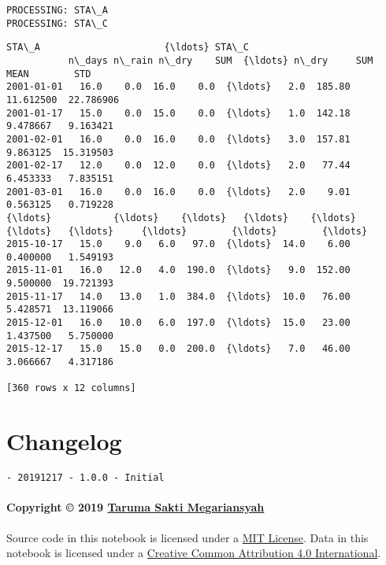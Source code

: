 \documentclass[11pt]{article}
\makeatletter
\newcommand{\boxspacing}{\kern\kvtcb@left@rule\kern\kvtcb@boxsep}
\newcommand{\prompt}[4]{
        \ttfamily\llap{{\color{#2}[#3]:\hspace{3pt}#4}}\vspace{-\baselineskip}
    }
\makeatother
\begin{document}
    \begin{Verbatim}[commandchars=\\\{\}]
PROCESSING: STA\_A
PROCESSING: STA\_C
    \end{Verbatim}

            \begin{tcolorbox}[breakable, size=fbox, boxrule=.5pt, pad at break*=1mm, opacityfill=0]
\prompt{Out}{outcolor}{12}{\boxspacing}
\begin{Verbatim}[commandchars=\\\{\}]
            STA\_A                      {\ldots} STA\_C
           n\_days n\_rain n\_dry    SUM  {\ldots} n\_dry     SUM       MEAN        STD
2001-01-01   16.0    0.0  16.0    0.0  {\ldots}   2.0  185.80  11.612500  22.786906
2001-01-17   15.0    0.0  15.0    0.0  {\ldots}   1.0  142.18   9.478667   9.163421
2001-02-01   16.0    0.0  16.0    0.0  {\ldots}   3.0  157.81   9.863125  15.319503
2001-02-17   12.0    0.0  12.0    0.0  {\ldots}   2.0   77.44   6.453333   7.835151
2001-03-01   16.0    0.0  16.0    0.0  {\ldots}   2.0    9.01   0.563125   0.719228
{\ldots}           {\ldots}    {\ldots}   {\ldots}    {\ldots}  {\ldots}   {\ldots}     {\ldots}        {\ldots}        {\ldots}
2015-10-17   15.0    9.0   6.0   97.0  {\ldots}  14.0    6.00   0.400000   1.549193
2015-11-01   16.0   12.0   4.0  190.0  {\ldots}   9.0  152.00   9.500000  19.721393
2015-11-17   14.0   13.0   1.0  384.0  {\ldots}  10.0   76.00   5.428571  13.119066
2015-12-01   16.0   10.0   6.0  197.0  {\ldots}  15.0   23.00   1.437500   5.750000
2015-12-17   15.0   15.0   0.0  200.0  {\ldots}   7.0   46.00   3.066667   4.317186

[360 rows x 12 columns]
\end{Verbatim}
\end{tcolorbox}
        
    \hypertarget{changelog}{%
\section{Changelog}\label{changelog}}

\begin{verbatim}
- 20191217 - 1.0.0 - Initial
\end{verbatim}

\hypertarget{copyright-2019-taruma-sakti-megariansyah}{%
\paragraph{\texorpdfstring{Copyright © 2019
\href{https://taruma.github.io}{Taruma Sakti
Megariansyah}}{Copyright © 2019 Taruma Sakti Megariansyah}}\label{copyright-2019-taruma-sakti-megariansyah}}

Source code in this notebook is licensed under a
\href{https://choosealicense.com/licenses/mit/}{MIT License}. Data in
this notebook is licensed under a
\href{https://creativecommons.org/licenses/by/4.0/}{Creative Common
Attribution 4.0 International}.


    
    
    
\end{document}
